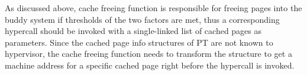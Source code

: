 As discussed above, cache freeing function is responsible for freeing pages into the buddy system if thresholds of the two factors are met, thus a corresponding hypercall should be invoked with a single-linked list of cached pages as parameters. Since the cached page info structures of PT are not known to hypervisor, the cache freeing function needs to transform the structure to get a machine address for a specific cached page right before the hypercall is invoked.

